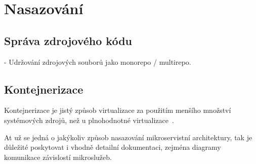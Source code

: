 \section{Nasazování}\label{sec:msa-deployment}



\subsection{Správa zdrojového kódu}\label{subsec:msa-deployment-code}
- Udržování zdrojových souborů jako monorepo / multirepo.



\subsection{Kontejnerizace}\label{subsec:msa-deployment-containerization}
Kontejnerizace je jistý způsob virtualizace za použitím menšího množství systémových zdrojů, než u plnohodnotné virtualizace~\cite{kontejnerizace}.


At už se jedná o jakýkoliv způsob nasazování mikroservistní architektury, tak je důležité poskytovat i vhodně detailní dokumentaci, zejména diagramy komunikace závislostí mikroslužeb.
